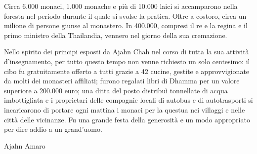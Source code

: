 Circa 6.000 monaci, 1.000 monache e più di 10.000 laici si accamparono
nella foresta nel periodo durante il quale si svolse la pratica. Oltre a
costoro, circa un milione di persone giunse al monastero. In 400.000,
compresi il re e la regina e il primo ministro della Thailandia, vennero
nel giorno della sua cremazione.

Nello spirito dei principi esposti da Ajahn Chah nel corso di tutta la
sua attività d'insegnamento, per tutto questo tempo non venne richiesto
un solo centesimo: il cibo fu gratuitamente offerto a tutti grazie a 42
cucine, gestite e approvvigionate da molti dei monasteri affiliati;
furono regalati libri di Dhamma per un valore superiore a 200.000 euro;
una ditta del posto distribuì tonnellate di acqua imbottigliata e i
proprietari delle compagnie locali di autobus e di autotrasporti si
incaricarono di portare ogni mattina i monaci per la questua nei
villaggi e nelle città delle vicinanze. Fu una grande festa della
generosità e un modo appropriato per dire addio a un grand'uomo.

Ajahn Amaro


